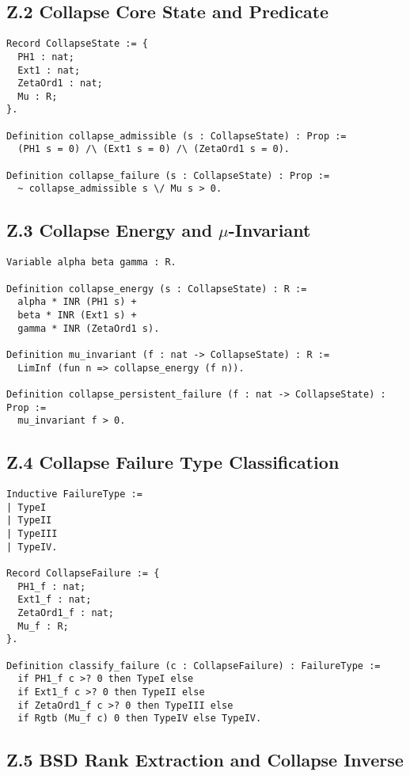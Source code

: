 \documentclass[11pt]{article}
\begin{document}
\subsection*{Z.2 Collapse Core State and Predicate}

\begin{lstlisting}[language=Coq]
Record CollapseState := {
  PH1 : nat;
  Ext1 : nat;
  ZetaOrd1 : nat;
  Mu : R;
}.

Definition collapse_admissible (s : CollapseState) : Prop :=
  (PH1 s = 0) /\ (Ext1 s = 0) /\ (ZetaOrd1 s = 0).

Definition collapse_failure (s : CollapseState) : Prop :=
  ~ collapse_admissible s \/ Mu s > 0.
\end{lstlisting}

\subsection*{Z.3 Collapse Energy and \(\mu\)-Invariant}

\begin{lstlisting}[language=Coq]
Variable alpha beta gamma : R.

Definition collapse_energy (s : CollapseState) : R :=
  alpha * INR (PH1 s) +
  beta * INR (Ext1 s) +
  gamma * INR (ZetaOrd1 s).

Definition mu_invariant (f : nat -> CollapseState) : R :=
  LimInf (fun n => collapse_energy (f n)).

Definition collapse_persistent_failure (f : nat -> CollapseState) : Prop :=
  mu_invariant f > 0.
\end{lstlisting}

\subsection*{Z.4 Collapse Failure Type Classification}

\begin{lstlisting}[language=Coq]
Inductive FailureType :=
| TypeI
| TypeII
| TypeIII
| TypeIV.

Record CollapseFailure := {
  PH1_f : nat;
  Ext1_f : nat;
  ZetaOrd1_f : nat;
  Mu_f : R;
}.

Definition classify_failure (c : CollapseFailure) : FailureType :=
  if PH1_f c >? 0 then TypeI else
  if Ext1_f c >? 0 then TypeII else
  if ZetaOrd1_f c >? 0 then TypeIII else
  if Rgtb (Mu_f c) 0 then TypeIV else TypeIV.
\end{lstlisting}

\subsection*{Z.5 BSD Rank Extraction and Collapse Inverse}
\end{document}
